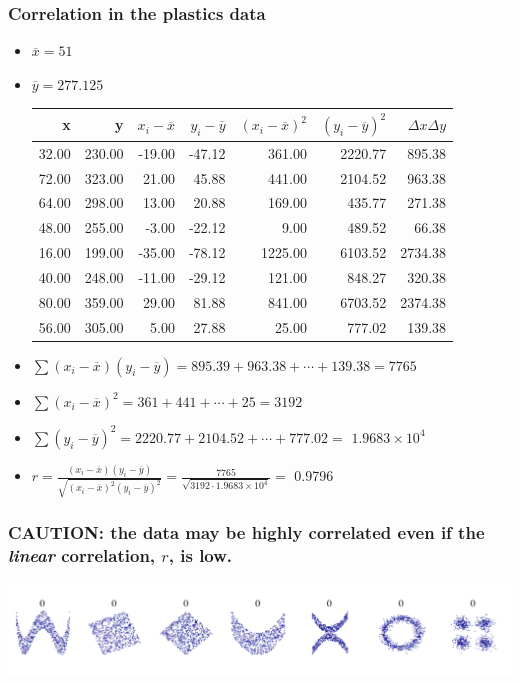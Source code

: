 \documentclass[handout]{beamer}\usepackage{graphicx, color}
\providecommand{\ov}[1]{\overline{#1}}
\numberwithin{equation}{section}
\begin{document}
\begin{frame}[fragile]
\frametitle{Correlation in the plastics data} \scriptsize
\begin{itemize}
\pause \item $\ov{x} = 51$
\pause \item $\ov{y} = 277.125$ \pause 
\begin{table}[ht]
\centering
\begin{tabular}{rrrrrrr}
 x & y & $x_i - \ov{x}$ & $y_i - \ov{y}$ & $(x_i - \ov{x})^2$ & $(y_i - \ov{y})^2$ & $\Delta x \Delta y$ \\ 
  \hline
32.00 & 230.00 & -19.00 & -47.12 & 361.00 & 2220.77 & 895.38 \\ 
  72.00 & 323.00 & 21.00 & 45.88 & 441.00 & 2104.52 & 963.38 \\ 
  64.00 & 298.00 & 13.00 & 20.88 & 169.00 & 435.77 & 271.38 \\ 
  48.00 & 255.00 & -3.00 & -22.12 & 9.00 & 489.52 & 66.38 \\ 
  16.00 & 199.00 & -35.00 & -78.12 & 1225.00 & 6103.52 & 2734.38 \\ 
  40.00 & 248.00 & -11.00 & -29.12 & 121.00 & 848.27 & 320.38 \\ 
  80.00 & 359.00 & 29.00 & 81.88 & 841.00 & 6703.52 & 2374.38 \\ 
  56.00 & 305.00 & 5.00 & 27.88 & 25.00 & 777.02 & 139.38 \\ 
  \end{tabular}
\end{table}


\pause \item $\sum (x_i - \ov{x})(y_i - \ov{y}) = 895.39 + 963.38 + \cdots + 139.38 = 7765$
\pause \item $\sum (x_i - \ov{x})^2 = 361 + 441 + \cdots + 25 = 3192$
\pause \item $\sum (y_i - \ov{y})^2 = 2220.77 + 2104.52 + \cdots + 777.02 = $ \ensuremath{1.9683\times 10^{4}}
\pause \item $r = \frac{ (x_i - \ov{x})(y_i - \ov{y})  }{\sqrt{  (x_i - \ov{x})^2   (y_i - \ov{y})^2  }} = \frac{7765}{\sqrt{3192 \cdot 1.9683 \times 10^4}} = $ 0.9796
\end{itemize}
\end{frame}

\begin{frame}
\frametitle{\small CAUTION: the data may be highly correlated even if the \emph{linear} correlation, $r$, is low.}
 \includegraphics{../../fig/corr0.png}
\end{frame}
\end{document}
